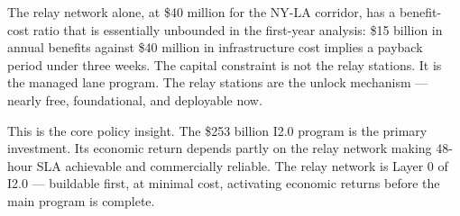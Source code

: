 The relay network alone, at \$40 million for the NY-LA corridor, has a benefit-cost ratio
that is essentially unbounded in the first-year analysis: \$15 billion in annual benefits
against \$40 million in infrastructure cost implies a payback period under three weeks.
The capital constraint is not the relay stations. It is the managed lane program. The relay
stations are the unlock mechanism --- nearly free, foundational, and deployable now.

This is the core policy insight. The \$253 billion I2.0 program is the primary investment.
Its economic return depends partly on the relay network making 48-hour SLA achievable and
commercially reliable. The relay network is Layer 0 of I2.0 --- buildable first, at
minimal cost, activating economic returns before the main program is complete.
